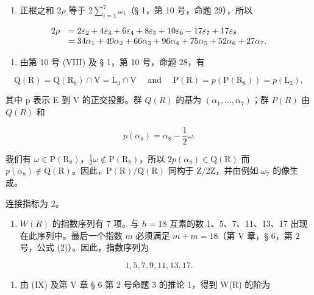 \begin{enumerate}
\def\labelenumi{(\Roman{enumi})}
\setcounter{enumi}{6}
\tightlist
\item
  正根之和 \(2\rho\) 等于 \(2\sum_{i=1}^{7}\omega_i\)（§ 1，第 10 号，命题 29），所以
\end{enumerate}

\[
\begin{array}{r l} 2 \rho & = 2 \varepsilon_ {2} + 4 \varepsilon_ {3} + 6 \varepsilon_ {4} + 8 \varepsilon_ {5} + 10 \varepsilon_ {6} - 17 \varepsilon_ {7} + 17 \varepsilon_ {8} \\ & = 34 \alpha_ {1} + 49 \alpha_ {2} + 66 \alpha_ {3} + 96 \alpha_ {4} + 75 \alpha_ {5} + 52 \alpha_ {6} + 27 \alpha_ {7}. \end{array}
\]

\begin{enumerate}
\def\labelenumi{(\Roman{enumi})}
\setcounter{enumi}{7}
\tightlist
\item
  由第 10 号 (VIII) 及 § 1，第 10 号，命题 28，有
\end{enumerate}

\[
\mathrm{Q} (\mathrm{R}) = \mathrm{Q} (\mathrm{R} _ {8}) \cap \mathrm{V} = \mathrm{L} _ {3} \cap \mathrm{V} \quad \text { and } \quad \mathrm{P} (\mathrm{R}) = p (\mathrm{P} (\mathrm{R} _ {8})) = p (\mathrm{L} _ {3}),
\]

其中 p 表示 E 到 V 的正交投影。群 \(Q(R)\) 的基为 \((\alpha_{1},\ldots,\alpha_{7})\)；群 \(P(R)\) 由 \(Q(R)\) 和

\[
p (\alpha_ {8}) = \alpha_ {8} - \frac {1}{2} \omega .
\]

我们有 \(\omega\in\mathrm{P}(\mathrm{R}_{8})\)，\(\frac{1}{2}\omega\notin\mathrm{P}(\mathrm{R}_{8})\)，所以 \(2p(\alpha_{8})\in\mathrm{Q}(\mathrm{R})\) 而 \(p(\alpha_{8})\notin\mathrm{Q}(\mathrm{R})\)。因此，\(\mathrm{P}(\mathrm{R})/\mathrm{Q}(\mathrm{R})\) 同构于 Z/2Z，并由例如 \(\omega_{7}\) 的像生成。

连接指标为 2。

\begin{enumerate}
\def\labelenumi{(\Roman{enumi})}
\setcounter{enumi}{8}
\tightlist
\item
  \(W(R)\) 的指数序列有 7 项。与 \(h = 18\) 互素的数 1、5、7、11、13、17 出现在此序列中。最后一个指数 \(m\) 必须满足 \(m + m = 18\)（第 V 章，§ 6，第 2 号，公式 (2)）。因此，指数序列为
\end{enumerate}

\[
1, 5, 7, 9, 11, 13, 17.
\]

\begin{enumerate}
\def\labelenumi{(\Alph{enumi})}
\setcounter{enumi}{23}
\tightlist
\item
  由 (IX) 及第 V 章 § 6 第 2 号命题 3 的推论 1，得到 W(R) 的阶为
\end{enumerate}

